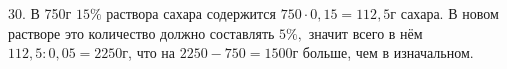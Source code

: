 30. В 750г $15\%$ раствора сахара содержится $750\cdot0,15=112,5$г сахара. В новом растворе это количество должно составлять $5\%,$ значит всего в нём $112,5:0,05=2250$г, что на $2250-750=1500$г больше, чем в изначальном.\\
